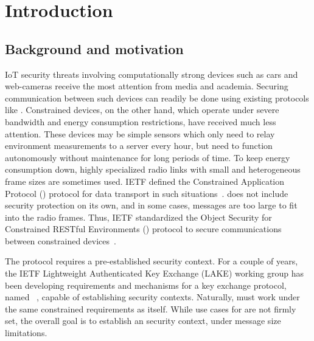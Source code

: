 \documentclass[runningheads, envcountsame, a4paper, draft, x11names]{llncs}
\begin{document}

\section{Introduction}
\label{sec:introduction}
 
\subsection{Background and motivation}
\label{sec:motivation}
 
IoT security threats involving computationally strong devices such as cars and web-cameras receive the most attention from media and academia. Securing communication between such devices can readily be done using existing protocols like \mDandTls. Constrained devices, on the other hand, which operate under severe bandwidth and energy consumption restrictions, have received much less attention. These devices may be simple sensors which only need to relay environment measurements to a server every hour, but need to function autonomously without maintenance for long periods of time. To keep energy consumption down, highly specialized radio links with small and heterogeneous frame sizes are sometimes used. IETF defined the Constrained Application Protocol (\mCoap{}) protocol for data transport in such situations~\cite{rfc7252}. \mCoap{} does not include security protection on its own, and in some cases, \mDandTls{} messages are too large to fit into the radio frames. Thus, IETF standardized the Object Security for Constrained RESTful Environments (\mOscore{}) protocol to secure communications between constrained devices~\cite{rfc8613}.

The \mOscore{} protocol requires a pre-established security context. For a couple of years, the IETF Lightweight Authenticated Key Exchange (LAKE) working group has been developing requirements and mechanisms for a key exchange protocol, named \mEdhoc~\cite{selander-lake-edhoc-01}, capable of establishing \mOscore{} security contexts. Naturally, \mEdhoc{} must work under the same constrained requirements as \mOscore{} itself. While use cases for \mEdhoc{} are not firmly set, the overall goal is to establish an \mOscore{} security context, under message size limitations. 
\end{document}
